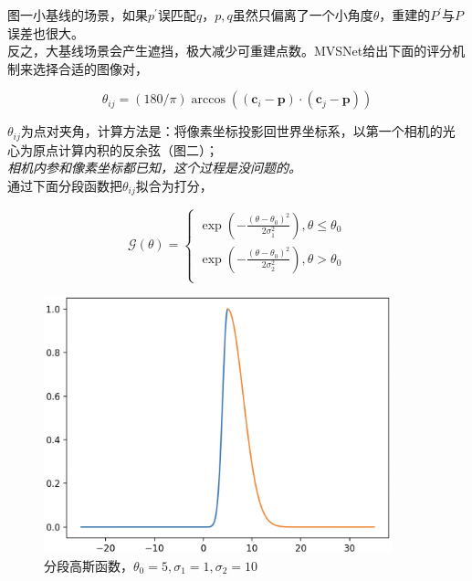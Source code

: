 	图一小基线的场景，如果$p^\prime$误匹配$q$，$p,q$虽然只偏离了一个小角度$\theta$，重建的$P^\prime$与$P$误差也很大。\\

	反之，大基线场景会产生遮挡，极大减少可重建点数。MVSNet给出下面的评分机制来选择合适的图像对，

	$$
		\theta_{ij} = (180/\pi)\arccos\left(
			(\mathbf{c}_i - \mathbf{p})
			\cdot
			(\mathbf{c}_j - \mathbf{p})
		\right)
	$$

	$\theta_{ij}$为点对夹角，计算方法是：将像素坐标投影回世界坐标系，以第一个相机的光心为原点计算内积的反余弦（图二）；\\

	\textit{相机内参和像素坐标都已知，这个过程是没问题的。}\\

	通过下面分段函数把$\theta_{ij}$拟合为打分，

	$$
		\mathcal{G}(\theta) = 
		\begin{cases}
			\exp\left(
				-\frac{(\theta-\theta_0)^2}{2\sigma_1^2}
			\right), \theta \leq \theta_0\\
			\exp\left(
				-\frac{(\theta-\theta_0)^2}{2\sigma_2^2}
			\right), \theta > \theta_0\\
		\end{cases}
	$$

	\begin{figure}[H]
		\begin{center}
			\includegraphics[width=0.9\textwidth]{../images/piece_gaussian.png}
		\end{center}
		\caption{分段高斯函数，$\theta_0=5, \sigma_1 = 1, \sigma_2 = 10$}
	\end{figure}

